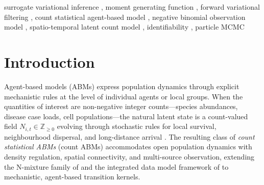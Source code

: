 \documentclass[review,12pt]{elsarticle}
\theoremstyle{definition}
\begin{document}
\begin{frontmatter}
\begin{abstract}
In a simulation study (50 replicates, $m=100$, $T=15$), SMFVB achieves
95\% variational interval coverage within 3 percentage points of particle MCMC
at a $22\times$ wall-time reduction (4~min vs.\ 92~min) under baseline conditions;
coverage degrades to 0.82--0.86 in three stress regimes (low abundance,
sparse observations, zero inflation), consistent with the theoretical
approximation properties.
Applied to Swiss Great Tit territory counts (MHB programme, $m=267$, $T=10$),
a variational EM extension simultaneously estimates detection and dispersal
parameters and yields in-sample calibration diagnostics consistent with surrogate self-consistency
($p\in(0.1,\,0.9)$ for three test statistics against training data).
\end{abstract}

\begin{keyword}
surrogate variational inference \sep
moment generating function \sep
forward variational filtering \sep
count statistical agent-based model \sep
negative binomial observation model \sep
spatio-temporal latent count model \sep
identifiability \sep
particle MCMC
\end{keyword}

\end{frontmatter}

\section{Introduction}\label{sec:intro}

Agent-based models (ABMs) express population dynamics through explicit
mechanistic rules at the level of individual agents or local groups.  When the
quantities of interest are non-negative integer counts---species abundances,
disease case loads, cell populations---the natural latent state is a
count-valued field $N_{i,t}\in\mathbb{Z}_{\ge0}$ evolving through stochastic
rules for local survival, neighbourhood dispersal, and long-distance arrival
\citep{hooten2010,heard2014}.  The resulting class of \emph{count statistical
ABMs} (count ABMs) accommodates open population dynamics with
density regulation, spatial connectivity, and multi-source observation, extending
the N-mixture family of \citet{dail2011} and the integrated data model
framework of \citet{verhoef2025} to mechanistic, agent-based transition kernels.
\end{document}
